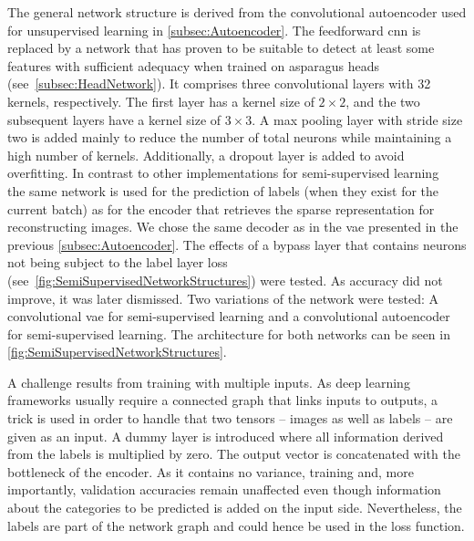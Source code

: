 \bigskip
The general network structure is derived from the convolutional autoencoder used for unsupervised learning in \autoref{subsec:Autoencoder}. The feedforward  \acrshort{cnn} is replaced by a network that has proven to be suitable to detect at least some features with sufficient adequacy when trained on asparagus heads (see~\autoref{subsec:HeadNetwork}). It comprises three convolutional layers with 32 kernels, respectively. The first layer has a kernel size of $2\times2$, and the two subsequent layers have a kernel size of $3\times3$. A max pooling layer with stride size two is added mainly to reduce the number of total neurons while maintaining a high number of kernels. Additionally, a dropout layer is added to avoid overfitting. In contrast to other implementations for semi-supervised learning~\citep{keng2017semi} the same network is used for the prediction of labels (when they exist for the current batch) as for the encoder that retrieves the sparse representation for reconstructing images. We chose the same decoder as in the \acrlong{vae} presented in the previous \autoref{subsec:Autoencoder}. The effects of a bypass layer that contains neurons not being subject to the label layer loss (see~\autoref{fig:SemiSupervisedNetworkStructures}) were tested. As accuracy did not improve, it was later dismissed. Two variations of the network were tested: A convolutional \acrshort{vae} for semi-supervised learning and a convolutional autoencoder for semi-supervised learning. The architecture for both networks can be seen in \autoref{fig:SemiSupervisedNetworkStructures}.

A challenge results from training with multiple inputs. As deep learning frameworks usually require a connected graph that links inputs to outputs, a trick is used in order to handle that two tensors -- images as well as labels -- are given as an input. A dummy layer is introduced where all information derived from the labels is multiplied by zero. The output vector is concatenated with the bottleneck of the encoder. As it contains no variance, training and, more importantly, validation accuracies remain unaffected even though information about the categories to be predicted is added on the input side. Nevertheless, the labels are part of the network graph and could hence be used in the loss function.

